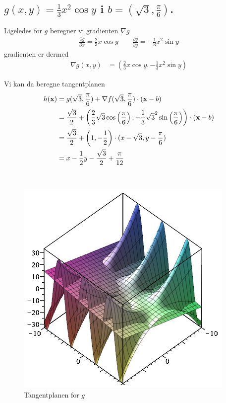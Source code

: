 \documentclass[11pt,a4paper]{article}
\newcommand{\colbreak}{\vfill{\ }\columnbreak}
\begin{document}
\subsection
{
    \mdseries $g(x,y) = \frac{1}{3} x^2 \cos y$ i $b = (\sqrt{3},\frac{\pi}{6})$.
}
\begin{multicols}{2}
    Ligeledes for $g$ beregner vi gradienten $\nabla g$
    \begin{align}
        \frac{\partial g}{\partial x} = \frac{2}{3}x \cos y
        \qquad
        \frac{\partial g}{\partial y} = -\frac{1}{3}x^2 \sin y
    \end{align}
    gradienten er dermed
    \begin{align}
        \nabla g(x,y) &= (\frac{2}{3}x \cos y, -\frac{1}{3}x^2 \sin y)
    \end{align}

    Vi kan da beregne tangentplanen
    \begin{align}
        h({\bf x}) &= g(\sqrt{3}, \frac{\pi}{6})
                    + \nabla f(\sqrt{3}, \frac{\pi}{6})
                      \cdot ({\bf x} - b) \\
                   &= \frac{\sqrt{3}}{2}
                    + \left(
                        \frac{2}{3} \sqrt{3}
                        \cos \left( \frac{\pi}{6} \right),
                        -\frac{1}{3} \sqrt{3}^2 \sin \left( \frac{\pi}{6} \right)
                      \right)
                      \cdot ({\bf x} - b) \\
                   &= \frac{\sqrt{3}}{2}
                    + \left( 1, -\frac{1}{2} \right)
                      \cdot (x - \sqrt{3}, y - \frac{\pi}{6}) \\
                      &= x - \frac{1}{2}y - \frac{\sqrt{3}}{2} + \frac{\pi}{12}
    \end{align}

    \colbreak

    \begin{figure}[H]
        \centering
        \includegraphics[scale=0.26]{figures/7-2b.png}
        \caption{Tangentplanen for $g$}
        \label{fig:7-2b}
    \end{figure}

\end{multicols}
\end{document}
